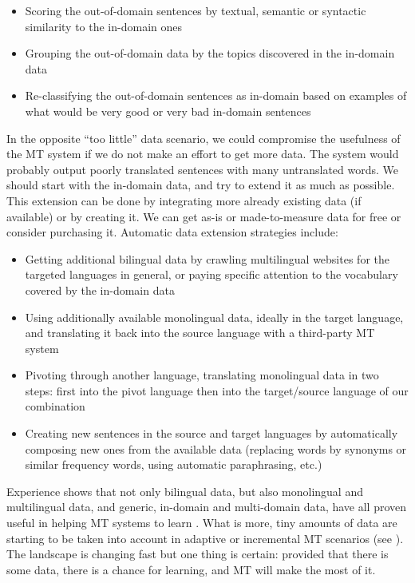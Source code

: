 \documentclass[output=paper]{langscibook}
\begin{document}
\begin{itemize}
\item Scoring the out-of-domain sentences by textual, semantic or syntactic similarity to the in-domain ones
\item Grouping the out-of-domain data by the topics discovered in the in-domain data
\item Re-classifying the out-of-domain sentences as in-domain based on examples of what would be very good or very bad in-domain sentences
\end{itemize}


In the opposite “too little” data scenario, we could compromise the usefulness of the MT system if we do not make an effort to get more data. The system would probably output poorly translated sentences with many untranslated words. We should start with the in-domain data, and try to extend it as much as possible. This extension can be done by integrating more already existing data (if available) or by creating it. We can get as-is or made-to-measure data for free or consider purchasing it. Automatic data extension strategies include: 
\begin{itemize}
\item Getting additional bilingual data by crawling multilingual websites for the targeted languages in general, or paying specific attention to the vocabulary covered by the in-domain data

\item Using additionally available monolingual data, ideally in the target language, and translating it back into the source language with a third-party MT system

\item Pivoting through another language, translating monolingual data in two steps: first into the pivot language then into the target/source language of our combination 
\item Creating new sentences in the source and target languages by automatically composing new ones from the available data (replacing words by synonyms or similar frequency words, using automatic paraphrasing, etc.)
\end{itemize}

Experience shows that not only bilingual data, but also monolingual and multilingual data, and generic, in-domain and multi-domain data, have all proven useful in helping MT systems to learn \citep{Saunders2021}.  What is more, tiny amounts of data are starting to be taken into account in adaptive or incremental MT scenarios (see ). The landscape is changing fast but one thing is certain:  provided that there is some data, there is a chance for learning, and MT will make the most of it.
\end{document}
